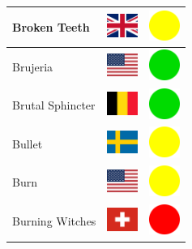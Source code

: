 \documentclass[12pt, a4paper, twoside]{report}
\begin{document}
\begin{center}
\begin{longtable}{|p{5cm}|p{2cm}|p{2cm}|}
 Broken Teeth                                               & \includegraphics[width=1cm]{../img/flags/gb} &   \includegraphics[width=1cm]{../likes/m} \\ \hline
 Brujeria                                                   & \includegraphics[width=1cm]{../img/flags/us} &   \includegraphics[width=1cm]{../likes/y} \\ \hline
 Brutal Sphincter                                           & \includegraphics[width=1cm]{../img/flags/be} &   \includegraphics[width=1cm]{../likes/y} \\ \hline
 Bullet                                                     & \includegraphics[width=1cm]{../img/flags/se} &   \includegraphics[width=1cm]{../likes/m} \\ \hline
 Burn                                                       & \includegraphics[width=1cm]{../img/flags/us} &   \includegraphics[width=1cm]{../likes/m} \\ \hline
 Burning Witches                                            & \includegraphics[width=1cm]{../img/flags/ch} &   \includegraphics[width=1cm]{../likes/n} \\ \hline

\end{longtable}
\end{center}
\end{document}
